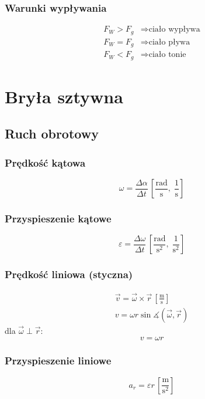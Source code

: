 \documentclass{article}
\numberwithin{equation}{section}
\newcommand{\unit}[1]{\, \left[\mathrm{#1}\right]}
\begin{document}
      \subsubsection{Warunki wypływania}
        \begin{align*}
          F_W > F_g &\Rightarrow \text{ciało wypływa}\\
          F_W = F_g &\Rightarrow \text{ciało pływa}\\
          F_W < F_g &\Rightarrow \text{ciało tonie}
        \end{align*}

  \newpage
  \section{Bryła sztywna}
    \subsection{Ruch obrotowy}
      \subsubsection{Prędkość kątowa}
        \begin{equation}
          \omega = \frac{\Delta\alpha}{\Delta t} \unit{\frac{rad}{s},\;\frac{1}{s}}
        \end{equation}
      \subsubsection{Przyspieszenie kątowe}
        \begin{equation}
          \varepsilon = \frac{\Delta\omega}{\Delta t} \unit{\frac{rad}{s^2},\;\frac{1}{s^2}}
        \end{equation}
      \subsubsection{Prędkość liniowa (styczna)}
        \begin{gather}
          \vec v = \vec\omega \times \vec r\unit{\frac{m}{s}}\\
          v = \omega r\sin\measuredangle (\vec\omega, \vec r)
        \end{gather}
        dla $\vec\omega \perp \vec r$:
        \begin{equation}
          v =\omega r
        \end{equation}
      \subsubsection{Przyspieszenie liniowe}
        \begin{equation}
          a_r = \varepsilon r \unit{\frac{m}{s^2}}
        \end{equation}
\end{document}
